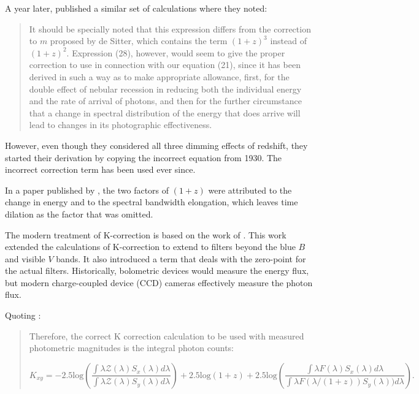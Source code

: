 \documentclass[linenumbers]{aastex631}
\begin{document}
A year later, \citet{hubble1935} published a similar set of calculations where they noted:

\begin{quote}
It should be specially noted that this expression differs from the correction
to $m$ proposed by de Sitter, which contains the term $(1 + z)^3$ instead of
$(1 + z)^2$. Expression (28), however, would seem to give the proper correction
to use in connection with our equation (21), since it has been derived in such
a way as to make appropriate allowance, first, for the double effect of nebular
recession in reducing both the individual energy and the rate of arrival of
photons, and then for the further circumstance that a change in spectral
distribution of the energy that does arrive will lead to changes in its
photographic effectiveness.
\end{quote}

\noindent However, even though they considered all three dimming effects of
redshift, they started their derivation by copying the incorrect equation from
1930. The incorrect correction term has been used ever since.

In a paper published by \citet{oke1968}, the two factors of $(1 + z)$ were
attributed to the change in energy and to the spectral bandwidth elongation,
which leaves time dilation as the factor that was omitted.

The modern treatment of K-correction is based on the work of \citet{kim1996}.
This work extended the calculations of K-correction to extend to filters beyond
the blue $B$ and visible $V$ bands. It also introduced a term that deals with
the zero-point for the actual filters. Historically, bolometric devices would
measure the energy flux, but modern charge-coupled device (CCD) cameras
effectively measure the photon flux.

Quoting \citet{kim1996}:

\begin{quote}
  Therefore, the correct K correction calculation to be used with measured
  photometric magnitudes is the integral photon counts:

  \begin{equation}
  \label{eq:kim}
    K_{xy} =
      -2.5\text{log} \left(
        \frac{\int \lambda \mathcal{Z}(\lambda)S_x(\lambda)d\lambda}
             {\int \lambda \mathcal{Z}(\lambda)S_y(\lambda)d\lambda}\right)
      + 2.5\text{log}(1+z)
      + 2.5\text{log}\left(
        \frac{\int \lambda F(\lambda)S_x(\lambda)d\lambda}
             {\int \lambda F(\lambda/(1+z))S_y(\lambda))d\lambda}\right).
  \end{equation}
\end{quote}
\end{document}
